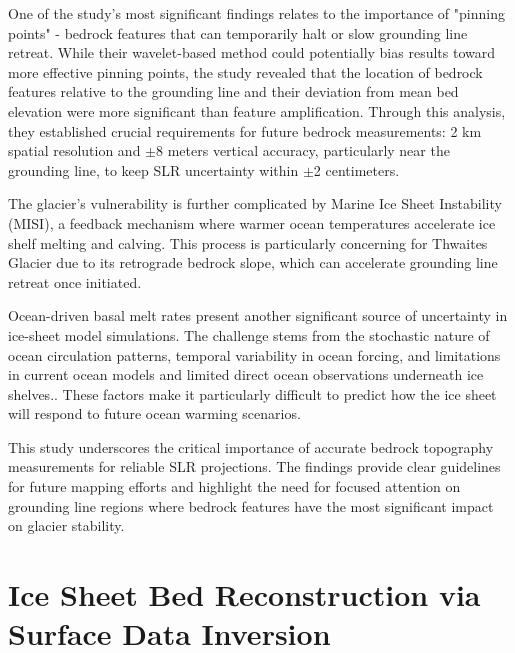 One of the study's most significant findings relates to the importance of "pinning points" - bedrock features that can temporarily halt or slow grounding line retreat. While their wavelet-based method could potentially bias results toward more effective pinning points, the study revealed that the location of bedrock features relative to the grounding line and their deviation from mean bed elevation were more significant than feature amplification\cite{Castleman_2022}. Through this analysis, they established crucial requirements for future bedrock measurements: 2 km spatial resolution and $\pm$8 meters vertical accuracy, particularly near the grounding line, to keep SLR uncertainty within $\pm$2 centimeters.

The glacier's vulnerability is further complicated by Marine Ice Sheet Instability (MISI)\cite{Castleman_2022}, a feedback mechanism where warmer ocean temperatures accelerate ice shelf melting and calving. This process is particularly concerning for Thwaites Glacier due to its retrograde bedrock slope\cite{Castleman_2022}, which can accelerate grounding line retreat once initiated.%


Ocean-driven basal melt rates present another significant source of uncertainty in ice-sheet model simulations. The challenge stems from the stochastic nature of ocean circulation patterns, temporal variability in ocean forcing, and limitations in current ocean models and limited direct ocean observations underneath ice shelves.\cite{Castleman_2022}. These factors make it particularly difficult to predict how the ice sheet will respond to future ocean warming scenarios\cite{Castleman_2022}.

This study underscores the critical importance of accurate bedrock topography measurements for reliable SLR projections. The findings provide clear guidelines for future mapping efforts and highlight the need for focused attention on grounding line regions where bedrock features have the most significant impact on glacier stability.

\section{Ice Sheet Bed Reconstruction via  Surface Data Inversion}\label{Ockenden_2022}


